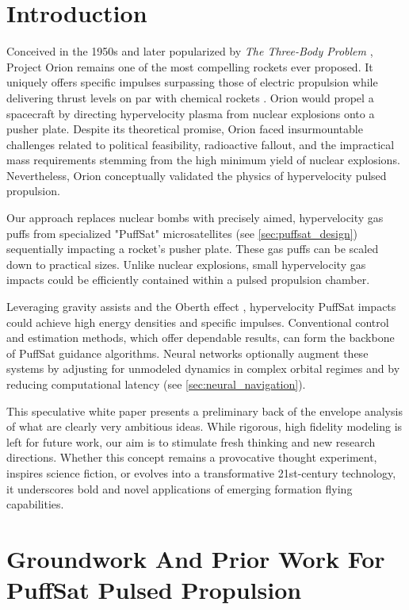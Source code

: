 \documentclass{article}
\begin{document}
\section{Introduction}
Conceived in the 1950s and later popularized by \textit{The Three-Body Problem} \cite{liu2014three}, Project Orion remains one of the most compelling rockets ever proposed. It uniquely offers specific impulses surpassing those of electric propulsion while delivering thrust levels on par with chemical rockets \cite{projorion}.   Orion would propel a spacecraft by directing hypervelocity plasma from nuclear explosions onto a pusher plate. Despite its theoretical promise, Orion faced insurmountable challenges related to political feasibility, radioactive fallout, and the impractical mass requirements stemming from the high minimum yield of nuclear explosions. Nevertheless, Orion conceptually validated the physics of hypervelocity pulsed propulsion.   

Our approach replaces nuclear bombs with precisely aimed, hypervelocity gas puffs from specialized "PuffSat" microsatellites (see \autoref{sec:puffsat_design}) sequentially impacting a rocket's pusher plate.  These gas puffs can be scaled down to practical sizes.  Unlike nuclear explosions, small hypervelocity gas impacts could be efficiently contained within a pulsed propulsion chamber.

Leveraging gravity assists and the Oberth effect \cite{oberth_effect}, hypervelocity PuffSat impacts could achieve high energy densities and specific impulses.  Conventional control and estimation methods, which offer dependable results, can form the backbone of PuffSat guidance algorithms.  Neural networks optionally augment these systems by adjusting for unmodeled dynamics in complex orbital regimes and by reducing computational latency (see \autoref{sec:neural_navigation}).  

This speculative white paper presents a preliminary back of the envelope analysis of what are clearly very ambitious ideas. While rigorous, high fidelity modeling is left for future work, our aim is to stimulate fresh thinking and new research directions. Whether this concept remains a provocative thought experiment, inspires science fiction, or evolves into a transformative 21st-century technology, it underscores bold and novel applications of emerging formation flying capabilities. 

\section{Groundwork And Prior Work For PuffSat Pulsed Propulsion}
\end{document}
